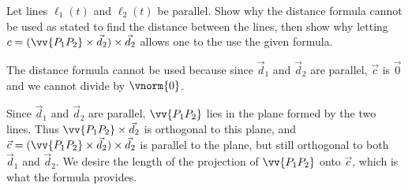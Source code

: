 {Let lines $\ell_1(t)$ and $\ell_2(t)$ be parallel. Show why the distance formula cannot be used as stated to find the distance between the lines, then show why letting $c=(\vv{P_1P_2}\times\vec d_2)\times\vec d_2$ allows one to the use the given formula.
}
{The distance formula cannot be used because since $\vec d_1$ and $\vec d_2$ are parallel, $\vec c$ is $\vec 0$ and we cannot divide by $\vnorm{0}$.

Since $\vec d_1$ and $\vec d_2$ are parallel, $\vv{P_1P_2}$ lies in the plane formed by the two lines. Thus $\vv{P_1P_2}\times\vec d_2$ is orthogonal to this plane, and $\vec c=(\vv{P_1P_2}\times\vec d_2)\times \vec d_2$ is parallel to the plane, but still orthogonal to both $\vec d_1$ and $\vec d_2$. We desire the length of the projection of $\vv{P_1P_2}$ onto $\vec c$, which is what the formula provides.
}


